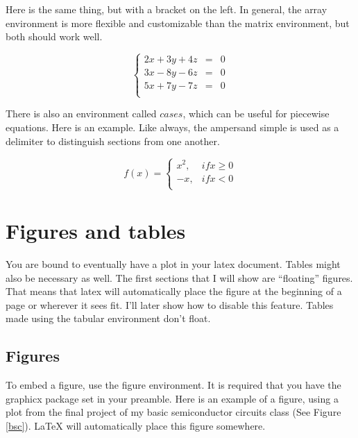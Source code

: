 \documentclass[11pt,letterpaper]{article}
\begin{document}
Here is the same thing, but with a bracket on the left. In general, the array
environment is more flexible and customizable than the matrix environment, but
both should work well.

\begin{displaymath}
    \left\{
    \begin{array}{lcr}
        2x + 3y + 4z & = & 0 \\
        3x - 8y - 6z & = & 0 \\
        5x + 7y - 7z & = & 0 \\
    \end{array}
    \right. %
\end{displaymath}

There is also an environment called $cases$, which can be useful for piecewise
equations. Here is an example. Like always, the ampersand simple is used as a
delimiter to distinguish sections from one another.

\begin{displaymath}
    f \left(x\right) =
    \begin{cases}
        x^2, & if x \geq 0 \\ %
        -x,  & if x < 0 \\
    \end{cases}
\end{displaymath}

\section{Figures and tables}

You are bound to eventually have a plot in your latex document. Tables might
also be necessary as well. The first sections that I will show are ``floating''
figures. That means that latex will automatically place the figure at the
beginning of a page or wherever it sees fit. I'll later show how to disable this
feature. Tables made using the tabular environment don't float.

\subsection{Figures}

To embed a figure, use the figure environment. It is required that you have the
graphicx package set in your preamble. Here is an example of a figure, using a
plot from the final project of my basic semiconductor circuits class (See Figure
\ref{bsc}). LaTeX will automatically place this figure somewhere. \\
\end{document}
